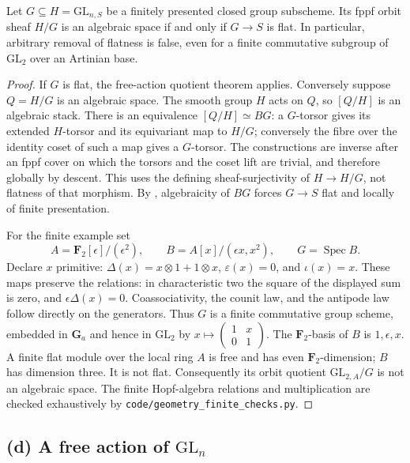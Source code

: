 \begin{theorem}
\label{geo-Kc}
Let $G\subseteq H=\mathrm{GL}_{n,S}$ be a finitely presented closed group
subscheme. Its fppf orbit sheaf $H/G$ is an algebraic space if and only if
$G\to S$ is flat.
In particular, arbitrary removal of flatness is false, even for a finite
commutative subgroup of $\mathrm{GL}_2$ over an Artinian base.
\end{theorem}
\begin{proof}
If $G$ is flat, the free-action quotient theorem
\cite[Lemma 80.11.7, tag 06PH]{geoStacksFreeQuotient} applies.
Conversely suppose $Q=H/G$ is an algebraic space. The smooth group $H$
acts on $Q$, so $[Q/H]$ is an algebraic stack. There is an equivalence
$[Q/H]\simeq BG$: a $G$-torsor gives its extended $H$-torsor and its
equivariant map to $H/G$; conversely the fibre over the identity coset of
such a map gives a $G$-torsor. The constructions are inverse after an fppf
cover on which the torsors and the coset lift are trivial, and therefore
globally by descent. This uses the defining sheaf-surjectivity of
$H\to H/G$, not flatness of that morphism. By
\cite[Lemma 97.18.3, tag 06PL]{geoStacksBG}, algebraicity of $BG$ forces
$G\to S$ flat and locally of finite presentation.

For the finite example set
\[
 A=\mathbf F_2[\epsilon]/(\epsilon^2),\qquad
 B=A[x]/(\epsilon x,x^2),\qquad G=\operatorname{Spec}B.
\]
Declare $x$ primitive: $\Delta(x)=x\otimes1+1\otimes x$,
$\varepsilon(x)=0$, and $\iota(x)=x$. These maps preserve the relations:
in characteristic two the square of the displayed sum is zero, and
$\epsilon\Delta(x)=0$. Coassociativity, the counit law, and the antipode
law follow directly on the generators. Thus $G$ is a finite commutative
group scheme, embedded in $\mathbf G_a$ and hence in $\mathrm{GL}_2$ by
$x\mapsto\left(\begin{smallmatrix}1&x\\0&1\end{smallmatrix}\right)$.
The $\mathbf F_2$-basis of $B$ is $1,\epsilon,x$. A finite flat module
over the local ring $A$ is free and has even $\mathbf F_2$-dimension;
$B$ has dimension three. It is not flat. Consequently its orbit quotient
$\mathrm{GL}_{2,A}/G$ is not an algebraic space. The finite Hopf-algebra
relations and multiplication are checked exhaustively by
\texttt{code/geometry\_finite\_checks.py}.
\end{proof}

\subsection{(d) A free action of $\mathrm{GL}_n$}

